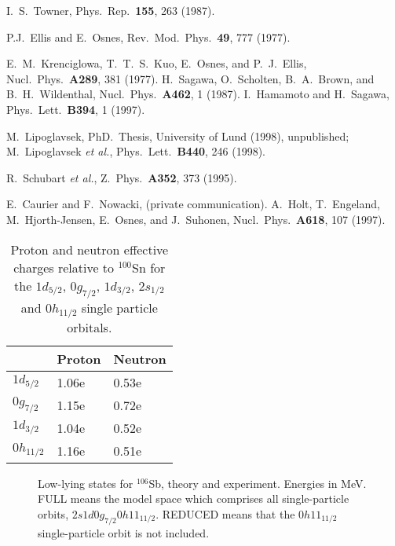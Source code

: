\begin{references}
 I.~S.~Towner, Phys.\ Rep.\ {\bf 155}, 263 (1987).

 P.J.\ Ellis and E.\ Osnes, Rev.~Mod.~Phys.~{\bf 49}, 777 (1977).

 E.~M.\ Krenciglowa, T.~T.~S.~Kuo, E.~Osnes, and P.~J.~Ellis,
                 Nucl.~Phys.~{\bf A289}, 381 (1977).
 H.\ Sagawa, O.\ Scholten, B.\ A.\ Brown, and B.\ H.\ Wildenthal,
Nucl.\ Phys.\ {\bf A462}, 1 (1987).
 I.\ Hamamoto and H.\ Sagawa, Phys.\ Lett.\ {\bf B394}, 1 (1997).

 M.\ Lipoglavsek, PhD.\ Thesis, University of Lund (1998), unpublished;
                M.\ Lipoglavsek {\em et al.}, Phys.\ Lett.\ {\bf B440}, 246 (1998).


 R.\ Schubart {\em et al.}, Z.\ Phys.\ {\bf A352}, 373 (1995).

 E.\ Caurier and F.\ Nowacki, (private communication).
 A.\ Holt, T.\ Engeland, M.\ Hjorth-Jensen, E.\ Osnes, and J.\ Suhonen,
                  Nucl.\ Phys.\ {\bf A618}, 107 (1997).


\end{references}


\clearpage


\begin{table}
\begin{center}
\caption{Proton and neutron effective charges relative to $^{100}$Sn for
the $1d_{5/2}$, $0g_{7/2}$, $1d_{3/2}$, $2s_{1/2}$ and $0h_{11/2}$
single particle orbitals.}
\begin{tabular}{lll}\\
& Proton & Neutron \\
\hline
$1d_{5/2}$ &1.06e &0.53e \\
$0g_{7/2}$ &1.15e &0.72e \\
$1d_{3/2}$ &1.04e &0.52e  \\
$0h_{11/2}$ &1.16e &0.51e \\
\end{tabular}
\label{tab:charges}
\end{center}
\end{table}

\begin{figure}
\caption{Low-lying states for  $^{106}$Sb, theory and experiment. 
         Energies in MeV. FULL means the model space which comprises all
         single-particle orbits, $2s1d0g_{7/2}0h11_{11/2}$. REDUCED means
         that the $0h11_{11/2}$ single-particle orbit is not included.}
\label{fig:energies}
\end{figure}




